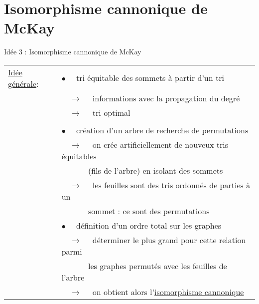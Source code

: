 \section{Isomorphisme cannonique de McKay}

\begin{frame}{Idée 3 : Isomorphisme cannonique de McKay}
\begin{tabular}{ll}
\underline{Idée générale}: & $\bullet \quad$ tri équitable des sommets à partir d'un tri \\
& $\quad \rightarrow \quad$ informations avec la propagation du degré \\
& $\quad \rightarrow \quad$ tri optimal \\
& \\
& $\bullet \quad$ création d'un arbre de recherche de permutations \\
& $\quad \rightarrow \quad$ on crée artificiellement de nouveux tris équitables \\
& $\qquad \quad$ (fils de l'arbre) en isolant des sommets \\
& $\quad \rightarrow \quad$ les feuilles sont des tris ordonnés de parties à un \\ 
& $\qquad \quad$ sommet : ce sont des permutations \\
& $\bullet \quad$ définition d'un ordre total sur les graphes \\
& $\quad \rightarrow \quad$ déterminer le plus grand pour cette relation parmi \\
& $\qquad \quad$ les graphes permutés avec les feuilles de l'arbre \\
& $\quad \rightarrow \quad$ on obtient alors l'\underline{isomorphisme cannonique}
\end{tabular}
\end{frame}

